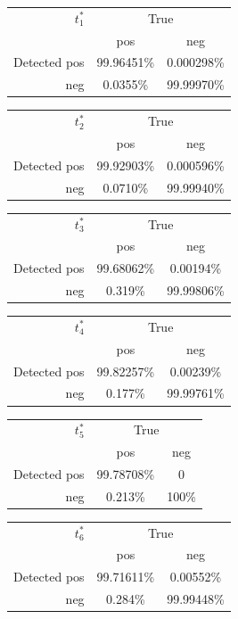 \documentclass[10pt,letterpaper]{article}
\begin{document}
\vspace{8pt}\par\noindent
\begin{tabular}{r|cc}
  $t^*_1$
  & \multicolumn{2}{c}{True} \\ 
  & pos & neg \\ 
  \hline  Detected pos & 99.96451\% & 0.000298\%\\ 
  neg & 0.0355\% & 99.99970\%\\ 
\end{tabular}
\vspace{8pt}\par\noindent
\begin{tabular}{r|cc}
  $t^*_2$ & \multicolumn{2}{c}{True} \\ 
  & pos & neg \\ 
  \hline  Detected pos & 99.92903\% & 0.000596\%\\ 
  neg & 0.0710\% & 99.99940\%\\ 
\end{tabular}
\vspace{8pt}\par\noindent
\begin{tabular}{r|cc}
  $t^*_3$ & \multicolumn{2}{c}{True} \\ 
  & pos & neg \\ 
  \hline  Detected pos & 99.68062\% & 0.00194\%\\ 
  neg & 0.319\% & 99.99806\%\\ 
\end{tabular}
\vspace{8pt}\par\noindent
\begin{tabular}{r|cc}
  $t^*_4$ & \multicolumn{2}{c}{True} \\ 
  & pos & neg \\ 
  \hline  Detected pos & 99.82257\% & 0.00239\%\\ 
  neg & 0.177\% & 99.99761\%\\ 
\end{tabular}
\vspace{8pt}\par\noindent
\begin{tabular}{r|cc}
  $t^*_5$ & \multicolumn{2}{c}{True} \\ 
  & pos & neg \\ 
  \hline  Detected pos & 99.78708\% & 0\\ 
  neg & 0.213\% & 100\%\\ 
\end{tabular}
\vspace{8pt}\par\noindent
\begin{tabular}{r|cc}
  $t^*_6$ & \multicolumn{2}{c}{True} \\ 
  & pos & neg \\ 
  \hline  Detected pos & 99.71611\% & 0.00552\%\\ 
  neg & 0.284\% & 99.99448\%\\ 
\end{tabular}
\vspace{8pt}\par\noindent
\end{document}
